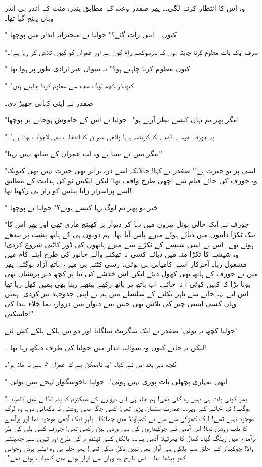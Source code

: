 وہ اس کا انتظار کرنے لگی۔۔ پھر صفدر وعدہ کے مطابق پندرہ منٹ کے اندر ہی اندر وہاں پہنچ گیا تھا۔

"کیوں۔۔ اتنی رات گئے؟" جولیا نے متحیرانہ انداز میں پوچھا۔

"صرف ایک بات معلوم کرنا چاہتا ہوں کہ سرسوکھے رام کون ہے اور عمران کو کیوں تلاش کر رہا ہے"۔

"کیوں معلوم کرنا چاہتے ہو؟" یہ سوال غیر ارادی طور پر ہوا تھا۔

"کیونکر کچھ لوگ مجھ سے معلوم کرنا چاہتے ہیں"۔

صفدر نے اپنی کہانی چھیڑ دی۔

"مگر پھر تم یہاں کیسے نظر آرہے ہو"۔ جولیا نے اس کے خاموش ہوجانے پر پوچھا!

"یہ جوزف جیسے گدھے کا کارنامہ ہے! واقعی عمران کا انتخاب بھی لاجواب ہوتا ہے"۔

"مگر میں نے سنا ہے وہ اب عمران کے ساتھ نہیں رہتا!"

"اسی پر تو حیرت ہے!" صفدر نے کہا! حالانکہ اسے ذرہ برابر بھی حیرت نہیں تھی کیونکہ وہ جوزف کی جائے قیام سے اچھی طرح واقف تھا! لیکن ایکس ٹو کی ہدایت کے مطابق اسے پراسرار رانا پیلس کو راز ہی رکھنا تھا!

"خیر تو پھر تم لوگ رہا کیسے ہوئے؟" جولیا نے پوچھا۔

"جوزف نے ایک خالی بوتل پیروں میں دبا کر دیوار پر کھینچ ماری تھی اور پھر اس کا نیک ٹکڑا دانتوں میں دبائے ہوئے میرے پاس آیا تھا۔ ہم دونوں ہی کے ہاتھ پشت پر بندھے ہوئے تھے۔ اس نے اسی شیشے کے ٹکڑے سے میرے ہاتھوں کی ڈور کاٹنی شروع کردی! وہ شیشے کا ٹکڑا منہ میں دبائے کسی نہ تھکنے والے جانور کی طرح اپنے کام میں مشغول رہا۔ آخرکار اسے کامیابی ہی ہوئی۔ رسی کٹتے ہی میرے ہاتھ آزاد ہوگئے! پھر میں نے جوزف کے ہاتھ بھی کھول دیئے لیکن اس خدشے کی بنا پر کچھ دیر پریشان بھی ہونا پڑا کہ کہیں کوئی آ نہ جائے۔ اب ہاتھ پر ہاتھ رکھے بیٹھے رہنا بھی ہمیں کھل رہا تھا اس لئے تہہ خانے سے باہر نکلنے کے سلسلے میں ہم نے اپنی جدوجہد تیز کردی۔ ہمیں وہاں کسی ایسی چیز کی تلاش تھی جس سے دیوار میں دروازہ نما خلاء پیدا کی جاسکتی!"

جولیا کچھ نہ بولی! صفدر نے ایک سگریٹ سلگایا اور دو تین ہلکے ہلکے کش لئے!

لیکن نہ جانے کیوں وہ سوالیہ انداز میں جولیا کی طرف دیکھ رہا تھا۔۔!

کچھ دیر بعد اس نے کہا۔ "یہ ناممکن ہے کہ عمران تم سے نہ ملا ہو"۔

"ابھی تمہاری پچھلی بات پوری نہیں ہوئی"۔ جولیا ناخوشگوار لہجے میں بولی۔

"پھر کوئی بات ہی نہیں رہ گئی تھی! ہم جلد ہی اس دروازے کے میکنزم کا پتہ لگانے میں کامیاب ہوگئے! تہہ خانے کے اوپر۔۔ عمارت سنسان پڑی تھی! کسی جگہ بھی روشنی نہ دکھائی دی۔ وہ لوگ موجود نہیں تھے! ایک کھڑکی سے میں نے کمپاؤنڈ میں جھانکا۔ باہر ایک آدمی موجود تھا اور برآمدے کا بلب روشن تھا! اس آدمی نے چوکیداروں کی سی وردی پہن رکھی تھی! جوزف کسی بلی کی طر برآمدے میں رینگ گیا۔ کمال کا پھرتیلا آدمی ہے۔۔ بالکل کسی تیندوے کی طرح اور تیزی سے جھپٹنے والا! چوکیدار کے حلق سے ہلکی سی آواز بھی نہیں نکل سکی تھی! پھر جلد ہی وہ اپنے ہوش وحواس کھو بیٹھا تھا۔۔ اس طرح ہم وہاں سے فرار ہونے میں کامیاب ہوئے تھے"۔

